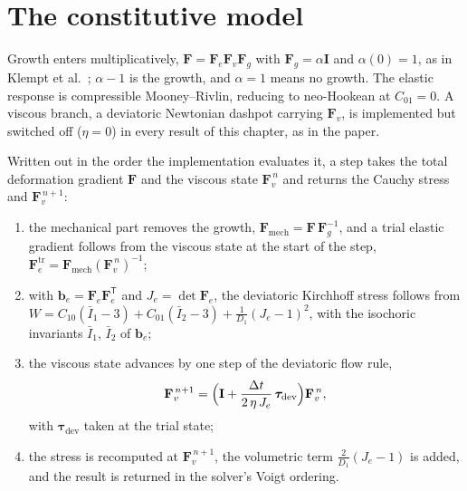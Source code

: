 \section{The constitutive model}
\label{sec:ch5-model}

Growth enters multiplicatively,
$\mathbf F = \mathbf F_e \mathbf F_v \mathbf F_g$ with
$\mathbf F_g = \alpha\mathbf I$ and $\alpha(0)=1$, as in Klempt et
al.~\cite{Klempt2024DiffusionDrivenGrowth}; $\alpha-1$ is the growth, and
$\alpha=1$ means no growth. The elastic response is compressible
Mooney--Rivlin, reducing to neo-Hookean at $C_{01}=0$. A viscous branch, a
deviatoric Newtonian dashpot carrying $\mathbf F_v$, is implemented but
switched off ($\eta=0$) in every result of this chapter, as in the paper.

Written out in the order the implementation evaluates it, a step takes the
total deformation gradient $\mathbf F$ and the viscous state
$\mathbf F_v^{\,n}$ and returns the Cauchy stress and $\mathbf F_v^{\,n+1}$:
\begin{enumerate}
\item the mechanical part removes the growth,
      $\mathbf F_{\mathrm{mech}} = \mathbf F\,\mathbf F_g^{-1}$, and a trial
      elastic gradient follows from the viscous state at the start of the step,
      $\mathbf F_e^{\mathrm{tr}} = \mathbf F_{\mathrm{mech}}(\mathbf F_v^{\,n})^{-1}$;
\item with $\mathbf b_e = \mathbf F_e \mathbf F_e^{\mathsf T}$ and
      $J_e = \det \mathbf F_e$, the deviatoric Kirchhoff stress follows from
      $W = C_{10}(\bar I_1 - 3) + C_{01}(\bar I_2 - 3) + \tfrac{1}{D_1}(J_e-1)^2$,
      with the isochoric invariants $\bar I_1$, $\bar I_2$ of $\mathbf b_e$;
\item the viscous state advances by one step of the deviatoric flow rule,
      \begin{equation}
        \mathbf F_v^{\,n+1} =
        \Bigl( \mathbf I + \frac{\Delta t}{2\,\eta\,J_e}\,
        \bm\tau_{\mathrm{dev}} \Bigr)\mathbf F_v^{\,n},
        \label{eq:ch5-flow}
      \end{equation}
      with $\bm\tau_{\mathrm{dev}}$ taken at the trial state;
\item the stress is recomputed at $\mathbf F_v^{\,n+1}$, the volumetric term
      $\tfrac{2}{D_1}(J_e-1)$ is added, and the result is returned in the
      solver's Voigt ordering.
\end{enumerate}

